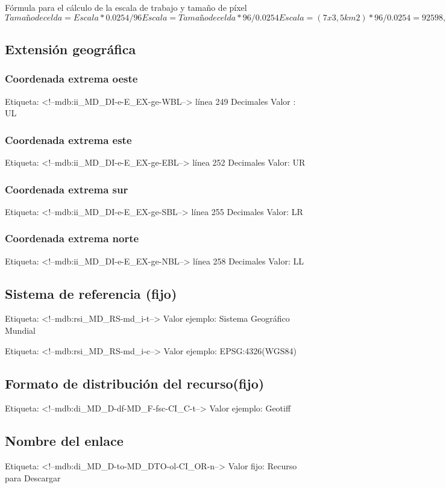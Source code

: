 \documentclass{GVT_CONAE_Class}
\begin{document}
Fórmula para el cálculo de la escala de trabajo y tamaño de píxel
$Tamaño de celda = Escala * 0.0254 / 96
Escala = Tamaño de celda * 96 / 0.0254
Escala = (7x3,5 km2) * 96 / 0.0254 = 92598,42519685 => 1:100.000 ?$

\subsection{Extensión geográfica}
\subsubsection{Coordenada extrema oeste}
Etiqueta: <!--mdb:ii\_MD\_DI-e-E\_EX-ge-WBL--> línea 249
Decimales
Valor : UL

\subsubsection{Coordenada extrema este}
Etiqueta: <!--mdb:ii\_MD\_DI-e-E\_EX-ge-EBL--> línea 252
Decimales
Valor: UR

\subsubsection{Coordenada extrema sur}
Etiqueta: <!--mdb:ii\_MD\_DI-e-E\_EX-ge-SBL--> línea 255
Decimales
Valor: LR

\subsubsection{Coordenada extrema norte}
Etiqueta: <!--mdb:ii\_MD\_DI-e-E\_EX-ge-NBL--> línea 258
Decimales
Valor: LL

\subsection{Sistema de referencia (fijo)}
Etiqueta: <!--mdb:rsi\_MD\_RS-md\_i-t--> 
Valor ejemplo: Sistema Geográfico Mundial

Etiqueta: <!--mdb:rsi\_MD\_RS-md\_i-c-->  
Valor ejemplo: EPSG:4326(WGS84)

\subsection{Formato de distribución del recurso(fijo)}
Etiqueta: <!--mdb:di\_MD\_D-df-MD\_F-fsc-CI\_C-t-->  
Valor ejemplo: Geotiff

\subsection{Nombre del enlace}
Etiqueta: <!--mdb:di\_MD\_D-to-MD\_DTO-ol-CI\_OR-n-->
Valor fijo: Recurso para Descargar
\end{document}
